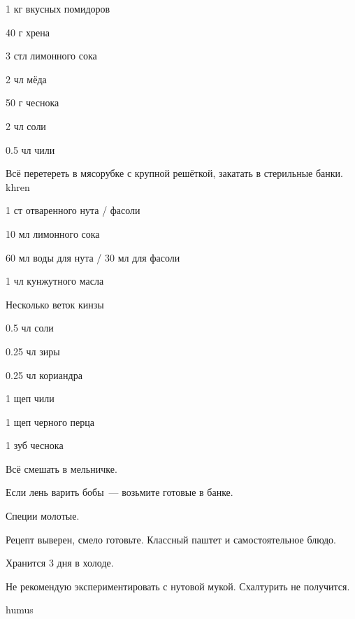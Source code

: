 {
\item 1 кг вкусных помидоров
\item 40 г хрена
\item 3 стл лимонного сока
\item 2 чл мёда
}{
\item 50 г чеснока
\item 2 чл соли
\item 0.5 чл чили 
}{
Всё перетереть в мясорубке с крупной решёткой, закатать в стерильные банки.
}{}{khren}



{
\item 1 ст отваренного нута / фасоли
\item 10 мл лимонного сока
\item 60 мл воды для нута / 30 мл для фасоли
\item 1 чл кунжутного масла
\item Несколько веток кинзы 
}{
\item 0.5 чл соли
\item 0.25 чл зиры
\item 0.25 чл кориандра
\item 1 щеп чили
\item 1 щеп черного перца
\item 1 зуб чеснока
}{
Всё смешать в мельничке.
}{
\begin{advice}
\item Если лень варить бобы~--- возьмите готовые в банке. 
\item Специи молотые. 
\item Рецепт выверен, смело готовьте. Классный паштет и самостоятельное блюдо.
\item Хранится 3 дня в холоде.
\item Не рекомендую экспериментировать с нутовой мукой. Схалтурить не получится.
\end{advice}}{humus}




